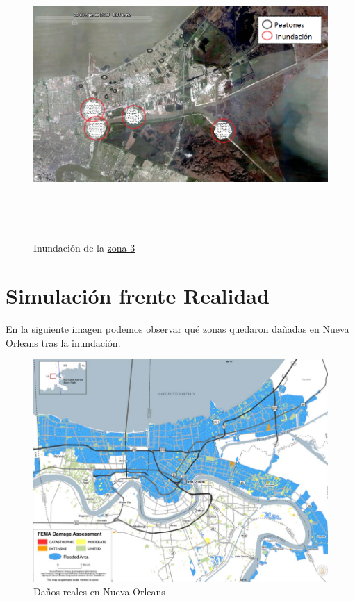 \begin{figure}[H]
 \centering
 \includegraphics[height=110mm,angle=90]{figuras/cap6/resultados/katrina3.png}
 \caption{Inundación de la \hyperref[zona3]{zona 3}}
\end{figure}

\section{Simulación frente Realidad}


En la siguiente imagen podemos observar qué zonas quedaron dañadas en Nueva
Orleans tras la inundación\cite{Gabe05}.

\begin{figure}[H]
 \centering
 \includegraphics[width=135mm]{figuras/cap6/NOdamage.png}
 \caption{Daños reales en Nueva Orleans}
\end{figure}

